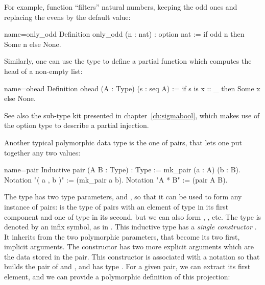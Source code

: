 For example, function  ``filters'' natural numbers, keeping the
odd ones and replacing the evens by the  default value:

\begin{coq}{name=only_odd}{}
Definition only_odd (n : nat) : option nat :=
  if odd n then Some n else None.
\end{coq}

Similarly, one can use the  type to define a partial function
which computes the head of a non-empty list:


\begin{coq}{name=ohead}{}
Definition ohead (A : Type) (s : seq A) :=
  if s is x :: _ then Some x else None.
\end{coq}


See also the sub-type kit presented in chapter~\ref{ch:sigmabool},
which makes use of the option type to describe a partial injection.

Another typical polymorphic data type is the one of pairs, that
lets one put together any two values:
\index[coq]{\C{(_ , _)}}

\begin{coq}{name=pair}{}
Inductive pair (A B : Type) : Type := mk_pair (a : A) (b : B).
Notation "( a , b )" := (mk_pair a b).
Notation "A * B" := (pair A B).
\end{coq}

The type  has two type parameters,  and
, so
that it can be used to form any instance of pairs: 
is the type of pairs with an element of type  in its first
component and one of type  in its second, but we can also form
, , etc. The type  is
denoted by an infix \C{*} symbol, as in .
This inductive type has
a \emph{single constructor} . It inherits from the two
polymorphic parameters, that become its two first, implicit arguments.
The constructor  has two more explicit arguments which are
the data stored in the pair. This constructor is associated with
a notation so that  builds the pair of  and , and
 has type . For a given pair, we can
extract its first element, and we can provide a polymorphic definition
of this projection:

